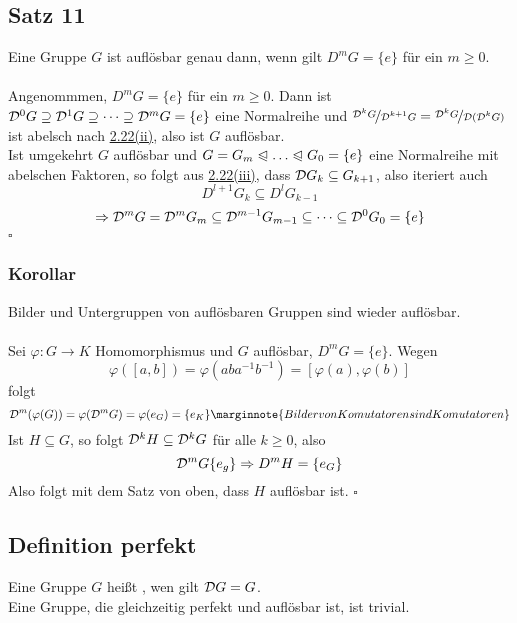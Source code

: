 \subsection{Satz 11}
\label{sub:satz_11}
Eine Gruppe $G$ ist auflösbar genau dann, wenn gilt $D^mG=\{e\}$ für ein $m\ge 0$.\\

\\
Angenommmen, $D^mG=\{e\}$ für ein $m\ge 0$. Dann ist $\mathcal{D}^0G\supseteq \mathcal{D}^1G\supseteq \dots\supseteq \mathcal{D}^mG=\{e\}$ eine Normalreihe und $\nicefrac{\mathcal{D}^kG}{\mathcal{D}^{k+1}G}=\nicefrac{\mathcal{D}^kG}{\mathcal{D}(\mathcal{D}^kG)}$ ist abelsch nach \hyperref[sub:komutatoren]{2.22(ii)}, also ist $G$ auflösbar.\\
Ist umgekehrt $G$ auflösbar und $G=G_m\nt\dots\nt G_0=\{e\}$ eine Normalreihe mit abelschen Faktoren, so folgt aus \hyperref[sub:komutatoren]{2.22(iii)}, dass $\mathcal{D} G_k\subseteq G_{k+1}$, also iteriert auch
\[
D^{l+1}G_k\subseteq D^lG_{k-1}
\]
\[
\Rightarrow \mathcal{D}^mG=\mathcal{D}^mG_m\subseteq \mathcal{D}^{m-1}G_{m-1}\subseteq\dots\subseteq \mathcal{D}^0G_0=\{e\}
\]
\hfill $\square$

\subsubsection*{Korollar}
Bilder und Untergruppen von auflösbaren Gruppen sind wieder auflösbar.\\

\\
Sei $\varphi:G\to K$ Homomorphismus und $G$ auflösbar, $D^mG=\{e\}$. Wegen
\[
\varphi([a,b])=\varphi(aba^{-1}b^{-1})=[\varphi(a),\varphi(b)]
\]
folgt
\[
\D^m(\varphi(G))= \varphi(\D^mG)=\varphi(e_G)=\{e_K\} \marginnote{Bilder von Komutatoren sind Komutatoren}
\]
Ist $H\subseteq G$, so folgt $\mathcal{D}^kH\subseteq \mathcal{D}^kG$ für alle $k\ge 0$, also 
\[
\mathcal{D}^mG\{e_g\}\Rightarrow D^mH=\{e_G\}
\]
Also folgt mit dem Satz von oben, dass $H$ auflösbar ist.
\hfill $\square$

\subsection{Definition perfekt}
\label{sub:def_perfekt}
Eine Gruppe $G$ heißt , wen gilt $\mathcal{D} G=G$.\\
Eine Gruppe, die gleichzeitig perfekt und auflösbar ist, ist trivial.

